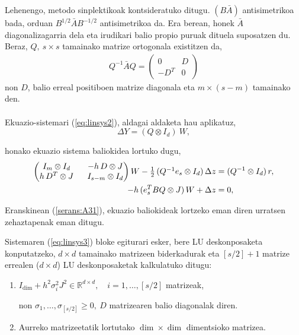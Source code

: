 Lehenengo, metodo sinplektikoak kontsideratuko ditugu. $(B \bar{A})$ antisimetrikoa bada, orduan $B^{1/2}\bar{A}B^{-1/2}$ antisimetrikoa da. Era berean, honek $\bar{A}$ diagonalizagarria dela eta irudikari balio propio puruak dituela suposatzen du. Beraz,  $Q, \ s \times s$ tamainako matrize ortogonala existitzen da,
\begin{align}
\label{eq:syb}
Q^{-1}\bar{A}Q=
\left(
\begin{matrix}
0 & D \\
-D^T & 0
\end{matrix}
\right)
\end{align}
non $D$,  balio erreal positiboen matrize diagonala eta $m \times (s-m)$ tamainako den. 

\paragraph*{}Ekuazio-sistemari (\ref{eq:linsys2}), aldagai aldaketa hau aplikatuz,
\begin{equation*}
 \Delta Y = (Q \otimes I_d) \ W,
\end{equation*}

honako ekuazio sistema baliokidea lortuko dugu,
\begin{equation}
\label{eq:linsys3}
\begin{split}
  \left(
  \begin{matrix}
    I_m \otimes I_d \ & \  -h \, D \otimes J  \\
    h \, D^T \otimes J \ & \ I_{s-m} \otimes I_d 
  \end{matrix}
\right) W -  \textstyle \frac12\, (Q^{-1} e_s \otimes I_d) \, \Delta z &=  (Q^{-1} \otimes I_d )\, r, \\
- h \, (e_s^T  B Q \otimes J) \, W + \Delta z &= 0,
\end{split}
\end{equation}

Eranskinean (\ref{serans:A31}), ekuazio baliokideak lortzeko eman diren urratsen zehaztapenak eman ditugu. 

Sistemaren (\ref{eq:linsys3}) bloke egiturari esker, bere LU deskonposaketa konputatzeko, $d \times d$ tamainako matrizeen biderkadurak eta $[s/2]+1$ matrize errealen ($d \times d$) LU deskonposaketak kalkulatuko ditugu:
\begin{enumerate}
\item $I_\dim + h^2 \sigma_i^2 J^2 \in \mathbb{R}^{d \times d}, \quad i=1,\ldots,[s/2]$ matrizeak,

non $\sigma_1,\ldots,\sigma_{[s/2]} \geq 0 , \ D$ matrizearen balio diagonalak diren.
\item Aurreko matrizeetatik lortutako $\dim \times \dim$ dimentsioko matrizea.
\end{enumerate} 


